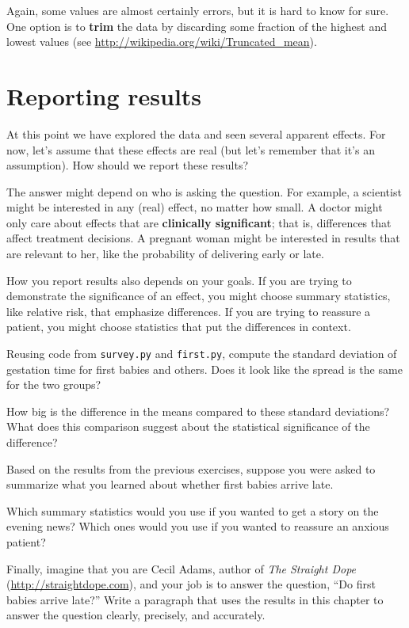 \documentclass[12pt]{book}
\begin{document}
Again, some values are almost certainly errors,
but it is hard to know for sure.  One option is to {\bf trim} the data
by discarding some fraction of the highest and lowest values (see
\url{http://wikipedia.org/wiki/Truncated_mean}).


\section{Reporting results}

At this point we have explored the data and seen several apparent
effects.  For now, let's assume that these effects are real (but let's
remember that it's an assumption).  How should we report these
results?

The answer might depend on who is asking the question.  For example, a
scientist might be interested in any (real) effect, no matter how
small.  A doctor might only care about effects that are {\bf
  clinically significant}; that is, differences that affect treatment
decisions.  A pregnant woman might be interested in results that are
relevant to her, like the probability of delivering early or late.

How you report results also depends on your goals.  If you are
trying to demonstrate the significance of an effect, you might choose
summary statistics, like relative risk, that emphasize differences.
If you are trying to reassure a patient, you might choose statistics
that put the differences in context.

\begin{exercise}
Reusing code from {\tt survey.py} and {\tt first.py}, compute the
standard deviation of gestation time for first babies and others.
Does it look like the spread is the same for the two groups?

How big is the difference in the means compared to these standard
deviations?  What does this comparison suggest about the statistical
significance of the difference?
\end{exercise}

\begin{exercise}
Based on the results from the previous exercises, suppose you were
asked to summarize what you learned about whether first
babies arrive late.

Which summary statistics would you use if you wanted to get a story
on the evening news?  Which ones would you use if you wanted to
reassure an anxious patient?

Finally, imagine that you are Cecil Adams, author of {\it The Straight
  Dope} (\url{http://straightdope.com}), and your job is to answer the
question, ``Do first babies arrive late?''  Write a paragraph that
uses the results in this chapter to answer the question clearly,
precisely, and accurately.

\end{exercise}
\end{document}
